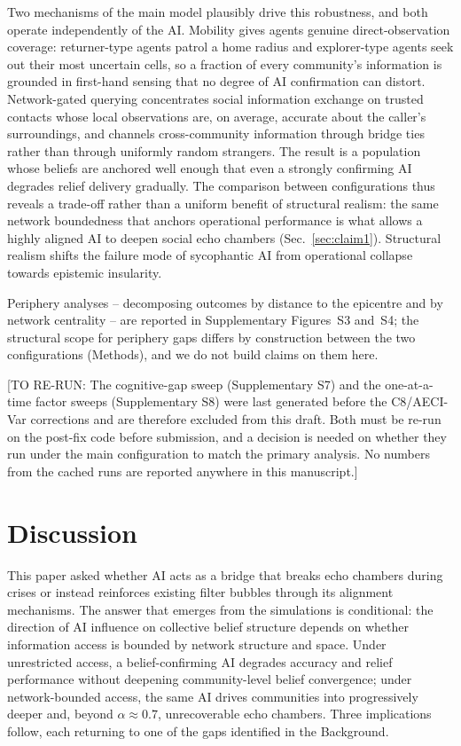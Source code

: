 \documentclass[sn-apacite]{sn-jnl}
\begin{document}
Two mechanisms of the main model plausibly drive this robustness, and both operate independently of the AI. Mobility gives agents genuine direct-observation coverage: returner-type agents patrol a home radius and explorer-type agents seek out their most uncertain cells, so a fraction of every community's information is grounded in first-hand sensing that no degree of AI confirmation can distort. Network-gated querying concentrates social information exchange on trusted contacts whose local observations are, on average, accurate about the caller's surroundings, and channels cross-community information through bridge ties rather than through uniformly random strangers. The result is a population whose beliefs are anchored well enough that even a strongly confirming AI degrades relief delivery gradually. The comparison between configurations thus reveals a trade-off rather than a uniform benefit of structural realism: the same network boundedness that anchors operational performance is what allows a highly aligned AI to deepen social echo chambers (Sec.~\ref{sec:claim1}). Structural realism shifts the failure mode of sycophantic AI from operational collapse towards epistemic insularity.

Periphery analyses -- decomposing outcomes by distance to the epicentre and by network centrality -- are reported in Supplementary Figures~S3 and~S4; the structural scope for periphery gaps differs by construction between the two configurations (Methods), and we do not build claims on them here.

[TO RE-RUN: The cognitive-gap sweep (Supplementary S7) and the one-at-a-time factor sweeps (Supplementary S8) were last generated before the C8/AECI-Var corrections and are therefore excluded from this draft. Both must be re-run on the post-fix code before submission, and a decision is needed on whether they run under the main configuration to match the primary analysis. No numbers from the cached runs are reported anywhere in this manuscript.]

\section{Discussion}\label{sec:discussion}

This paper asked whether AI acts as a bridge that breaks echo chambers during crises or instead reinforces existing filter bubbles through its alignment mechanisms. The answer that emerges from the simulations is conditional: the direction of AI influence on collective belief structure depends on whether information access is bounded by network structure and space. Under unrestricted access, a belief-confirming AI degrades accuracy and relief performance without deepening community-level belief convergence; under network-bounded access, the same AI drives communities into progressively deeper and, beyond $\alpha \approx 0.7$, unrecoverable echo chambers. Three implications follow, each returning to one of the gaps identified in the Background.
\end{document}
